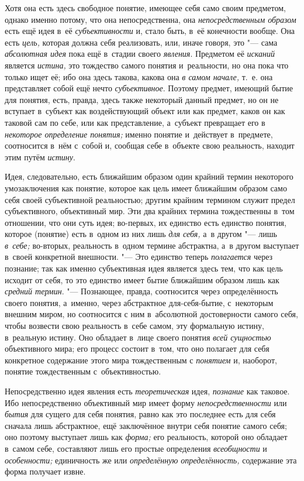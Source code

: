 Хотя она есть здесь свободное понятие, имеющее себя само своим
предметом, однако именно потому, что она непосредственна, она
{\em непосредственным образом}
есть ещё идея в~её
{\em субъективности} и,
стало быть, в~её конечности вообще. Она есть
{\em цель,} которая
должна себя реализовать, или, иначе говоря, это "--- сама
{\em абсолютная идея}
пока ещё в~стадии своего
{\em явления}. Предметом
её {\em исканий} является
{\em истина,} это
тождество самого понятия и~реальности, но она пока что только ищет её; ибо
она здесь такова, какова она {\em в
самом начале,} т.~е. она представляет собой ещё нечто
{\em субъективное}.
Поэтому предмет, имеющий бытие для понятия, есть, правда,
здесь также некоторый данный предмет, но он не вступает в~субъект как
воздействующий объект или как предмет, каков он как таковой сам по себе,
или как представление, а~субъект превращает его в
{\em некоторое определение понятия;}
именно понятие и~действует в~предмете, соотносится в~нём с~собой
и, сообщая себе в~объекте свою реальность, находит этим путём {\em истину}.

Идея, следовательно, есть ближайшим образом один крайний
термин некоторого умозаключения как понятие, которое как цель имеет
ближайшим образом само себя своей субъективной реальностью; другим крайним
термином служит предел субъективного, объективный мир. Эти два крайних
термина тождественны в~том отношении, что они суть идея; во-первых, их
единство есть единство понятия, которое (понятие) есть в~одном из них лишь
{\em для себя,} а~в другом "--- лишь {\em в~себе;}
во-вторых, реальность в~одном термине абстрактна, а~в другом
выступает в~своей конкретной внешности. "--- Это
единство теперь {\em полагается}
через познание; так как именно субъективная идея является
здесь тем, что как цель исходит от себя, то это единство имеет бытие
ближайшим образом лишь как {\em средний
термин}. "--- Познающее, правда, соотносится через
определённость своего понятия, а~именно, через абстрактное
для-себя-бытие, с~некоторым внешним миром, но соотносится с
ним в~абсолютной достоверности самого себя, чтобы возвести свою реальность
в~себе самом, эту формальную истину, в~реальную истину. Оно обладает в~лице
своего понятия {\em всей сущностью}
объективного мира; его процесс состоит в~том, что оно
полагает для себя конкретное содержание этого мира тождественным с
{\em понятием} и,
наоборот, понятие тождественным с~объективностью.

Непосредственно идея явления есть
{\em теоретическая} идея,
{\em познание} как
таковое. Ибо непосредственно объективный мир имеет форму
{\em непосредственности}
или {\em бытия}
для сущего для себя понятия, равно как это последнее есть для
себя сначала лишь абстрактное, ещё заключённое внутри себя понятие самого
себя; оно поэтому выступает лишь как {\em форма;} его
реальность, которой оно обладает в~самом себе, составляют лишь его простые
определения {\em всеобщности} и {\em особенности;} единичность же или
{\em определённую определённость,} содержание эта форма получает извне.

